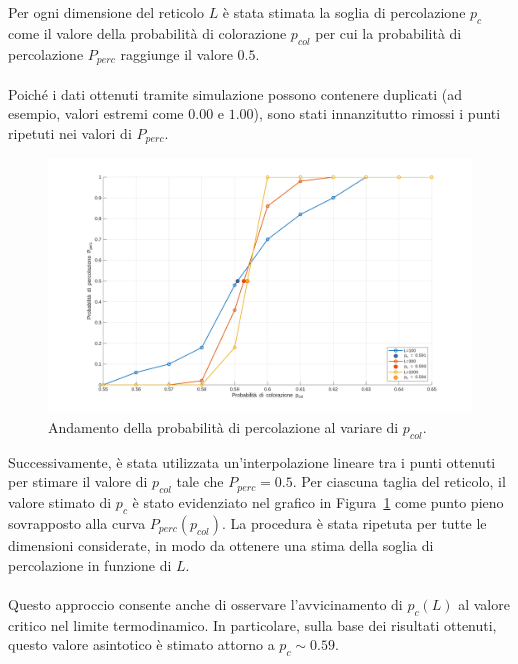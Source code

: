 \vspace{15px}
\noindent
Per ogni dimensione del reticolo $L$ è stata stimata la soglia di percolazione $p_c$ come il valore della probabilità di colorazione $p_{col}$ per cui la probabilità di percolazione $P_{perc}$ raggiunge il valore $0.5$.
\\\\
\noindent
Poiché i dati ottenuti tramite simulazione possono contenere duplicati (ad esempio, valori estremi come $0.00$ e $1.00$), sono stati innanzitutto rimossi i punti ripetuti nei valori di $P_{perc}$.

\begin{figure}[H]
	\centering
	\includegraphics[width=\linewidth]{images/percolation_threshold.png}
	\caption{Andamento della probabilità di percolazione al variare di $p_{col}$.}
	\label{fig:perc_thr}
\end{figure}

\noindent
Successivamente, è stata utilizzata un’interpolazione lineare tra i punti ottenuti per stimare il valore di $p_{col}$ tale che $P_{perc} = 0.5$. Per ciascuna taglia del reticolo, il valore stimato di $p_c$ è stato evidenziato nel grafico in Figura~\ref{fig:perc_thr} come punto pieno sovrapposto alla curva $P_{perc}(p_{col})$. La procedura è stata ripetuta per tutte le dimensioni considerate, in modo da ottenere una stima della soglia di percolazione in funzione di $L$.
\\\\
\noindent
Questo approccio consente anche di osservare l’avvicinamento di $p_c(L)$ al valore critico nel limite termodinamico. In particolare, sulla base dei risultati ottenuti, questo valore asintotico è stimato attorno a $p_c \sim 0.59$.

